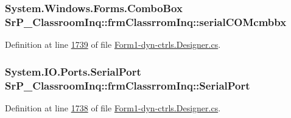 \hypertarget{class_sr_p___classroom_inq_1_1frm_classrrom_inq_a78530d93c34ef9033ba7bd57c265782a}{
\subsubsection[{serial\-C\-O\-Mcmbbx}]{\setlength{\rightskip}{0pt plus 5cm}\-System.\-Windows.\-Forms.\-Combo\-Box {\bf \-Sr\-P\-\_\-\-Classroom\-Inq\-::frm\-Classrrom\-Inq\-::serial\-C\-O\-Mcmbbx}}}
\label{class_sr_p___classroom_inq_1_1frm_classrrom_inq_a78530d93c34ef9033ba7bd57c265782a}


\-Definition at line \hyperlink{_form1-dyn-ctrls_8_designer_8cs_source_l01739}{1739} of file \hyperlink{_form1-dyn-ctrls_8_designer_8cs_source}{\-Form1-\/dyn-\/ctrls.\-Designer.\-cs}.

\hypertarget{class_sr_p___classroom_inq_1_1frm_classrrom_inq_ae7bb088b1faefea06978daccf238ecd0}{
\subsubsection[{\-Serial\-Port}]{\setlength{\rightskip}{0pt plus 5cm}\-System.\-I\-O.\-Ports.\-Serial\-Port {\bf \-Sr\-P\-\_\-\-Classroom\-Inq\-::frm\-Classrrom\-Inq\-::\-Serial\-Port}}}
\label{class_sr_p___classroom_inq_1_1frm_classrrom_inq_ae7bb088b1faefea06978daccf238ecd0}


\-Definition at line \hyperlink{_form1-dyn-ctrls_8_designer_8cs_source_l01738}{1738} of file \hyperlink{_form1-dyn-ctrls_8_designer_8cs_source}{\-Form1-\/dyn-\/ctrls.\-Designer.\-cs}.

